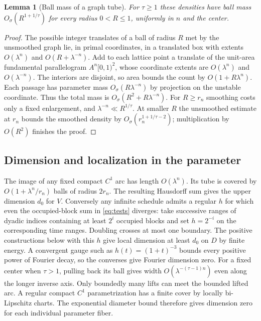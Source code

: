 \documentclass[11pt,a4paper,reqno]{amsart}
\newtheorem{lemma}[theorem]{Lemma}
\theoremstyle{definition}
\theoremstyle{remark}
\numberwithin{equation}{section}
\begin{document}
\begin{lemma}[Ball mass of a graph tube]\label{lem:ball}
For \(\tau\ge1\) these densities have ball mass \(O_\sigma(R^{1+1/\tau})\)
for every radius \(0<R\le1\), uniformly in \(n\) and the center.
\end{lemma}
\begin{proof}
The possible integer translates of a ball of radius \(R\) met by the
unsmoothed graph lie, in primal coordinates, in a translated box with
extents \(O(\lambda^n)\) and \(O(R+\lambda^{-n})\). Add to each lattice
point a translate of the unit-area fundamental parallelogram
\(A^n[0,1)^2\), whose coordinate extents are \(O(\lambda^n)\) and
\(O(\lambda^{-n})\). The interiors are disjoint, so area bounds the count
by \(O(1+R\lambda^n)\). Each passage has parameter mass
\(O_\sigma(R\lambda^{-n})\) by projection on the unstable coordinate.
Thus the total mass is \(O_\sigma(R^2+R\lambda^{-n})\).
For \(R\ge r_n\) smoothing costs only a fixed enlargement, and
\(\lambda^{-n}\ll R^{1/\tau}\). At smaller \(R\) the unsmoothed estimate
at \(r_n\) bounds the smoothed density by \(O_\sigma(r_n^{1+1/\tau-2})\);
multiplication by \(O(R^2)\) finishes the proof.
\end{proof}

\subsection{Dimension and localization in the parameter}
The image of any fixed compact \(C^1\) arc has length \(O(\lambda^n)\).
Its tube is covered by \(O(1+\lambda^n/r_n)\) balls of radius \(2r_n\).
The resulting Hausdorff sum gives the upper dimension \(d_0\) for \(V\).
Conversely any infinite schedule admits a regular \(h\) for which even
the occupied-block sum in \eqref{eq:tests} diverges: take successive
ranges of dyadic indices containing at least \(2^i\) occupied blocks
and set \(h=2^{-i}\) on the corresponding time ranges. Doubling crosses
at most one boundary. The positive constructions below with this \(h\)
give local dimension at least \(d_0\) on \(D\) by finite energy. A convergent
gauge such as \(h(t)=(1+t)^{-3}\) bounds every positive power of Fourier
decay, so the converses give Fourier dimension zero. For a fixed center
when \(\tau>1\), pulling back its ball gives width
\(O(\lambda^{-(\tau-1)n})\) even along the longer inverse axis.
Only boundedly many lifts can meet the bounded lifted arc. A regular
compact \(C^1\) parametrization has a finite cover by locally bi-Lipschitz
charts. The exponential diameter bound therefore gives dimension zero
for each individual parameter fiber.
\end{document}
